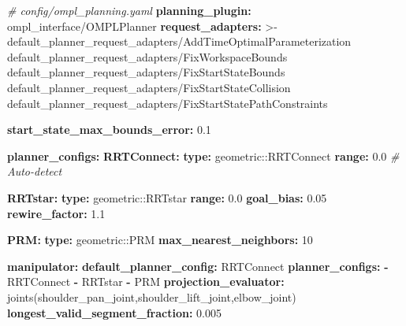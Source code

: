 \documentclass[
]{article}
\newenvironment{Shaded}{\begin{snugshade}}{\end{snugshade}}
\newcommand{\AttributeTok}[1]{\textcolor[rgb]{0.13,0.29,0.53}{#1}}
\newcommand{\CharTok}[1]{\textcolor[rgb]{0.31,0.60,0.02}{#1}}
\newcommand{\CommentTok}[1]{\textcolor[rgb]{0.56,0.35,0.01}{\textit{#1}}}
\newcommand{\DecValTok}[1]{\textcolor[rgb]{0.00,0.00,0.81}{#1}}
\newcommand{\FloatTok}[1]{\textcolor[rgb]{0.00,0.00,0.81}{#1}}
\newcommand{\FunctionTok}[1]{\textcolor[rgb]{0.13,0.29,0.53}{\textbf{#1}}}
\newcommand{\KeywordTok}[1]{\textcolor[rgb]{0.13,0.29,0.53}{\textbf{#1}}}
\newcommand{\NormalTok}[1]{#1}
\begin{document}
\begin{Shaded}
\begin{Highlighting}[]
\CommentTok{\# config/ompl\_planning.yaml}
\FunctionTok{planning\_plugin}\KeywordTok{:}\AttributeTok{ ompl\_interface/OMPLPlanner}
\FunctionTok{request\_adapters}\KeywordTok{: }\CharTok{\textgreater{}{-}}
\NormalTok{  default\_planner\_request\_adapters/AddTimeOptimalParameterization}
\NormalTok{  default\_planner\_request\_adapters/FixWorkspaceBounds}
\NormalTok{  default\_planner\_request\_adapters/FixStartStateBounds}
\NormalTok{  default\_planner\_request\_adapters/FixStartStateCollision}
\NormalTok{  default\_planner\_request\_adapters/FixStartStatePathConstraints}

\FunctionTok{start\_state\_max\_bounds\_error}\KeywordTok{:}\AttributeTok{ }\FloatTok{0.1}

\FunctionTok{planner\_configs}\KeywordTok{:}
\AttributeTok{  }\FunctionTok{RRTConnect}\KeywordTok{:}
\AttributeTok{    }\FunctionTok{type}\KeywordTok{:}\AttributeTok{ geometric::RRTConnect}
\AttributeTok{    }\FunctionTok{range}\KeywordTok{:}\AttributeTok{ }\FloatTok{0.0}\CommentTok{  \# Auto{-}detect}

\AttributeTok{  }\FunctionTok{RRTstar}\KeywordTok{:}
\AttributeTok{    }\FunctionTok{type}\KeywordTok{:}\AttributeTok{ geometric::RRTstar}
\AttributeTok{    }\FunctionTok{range}\KeywordTok{:}\AttributeTok{ }\FloatTok{0.0}
\AttributeTok{    }\FunctionTok{goal\_bias}\KeywordTok{:}\AttributeTok{ }\FloatTok{0.05}
\AttributeTok{    }\FunctionTok{rewire\_factor}\KeywordTok{:}\AttributeTok{ }\FloatTok{1.1}

\AttributeTok{  }\FunctionTok{PRM}\KeywordTok{:}
\AttributeTok{    }\FunctionTok{type}\KeywordTok{:}\AttributeTok{ geometric::PRM}
\AttributeTok{    }\FunctionTok{max\_nearest\_neighbors}\KeywordTok{:}\AttributeTok{ }\DecValTok{10}

\FunctionTok{manipulator}\KeywordTok{:}
\AttributeTok{  }\FunctionTok{default\_planner\_config}\KeywordTok{:}\AttributeTok{ RRTConnect}
\AttributeTok{  }\FunctionTok{planner\_configs}\KeywordTok{:}
\AttributeTok{    }\KeywordTok{{-}}\AttributeTok{ RRTConnect}
\AttributeTok{    }\KeywordTok{{-}}\AttributeTok{ RRTstar}
\AttributeTok{    }\KeywordTok{{-}}\AttributeTok{ PRM}
\AttributeTok{  }\FunctionTok{projection\_evaluator}\KeywordTok{:}\AttributeTok{ joints(shoulder\_pan\_joint,shoulder\_lift\_joint,elbow\_joint)}
\AttributeTok{  }\FunctionTok{longest\_valid\_segment\_fraction}\KeywordTok{:}\AttributeTok{ }\FloatTok{0.005}
\end{Highlighting}
\end{Shaded}
\end{document}
